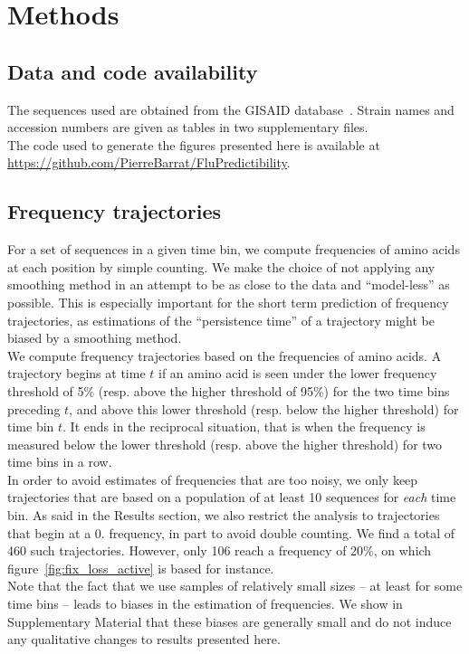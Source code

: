 \documentclass[reprint,amsmath,amssymb,superscriptaddress,showpacs,pre]{revtex4-1}
\begin{document}

\section*{Methods} %
\label{sec:methods}

\subsection*{Data and code availability} %
\label{sub:data}
	The sequences used are obtained from the GISAID database~\cite{shu2017gisaid}. 
	Strain names and accession numbers are given as tables in two supplementary files. \\
	The code used to generate the figures presented here is available at \url{https://github.com/PierreBarrat/FluPredictibility}. 

\subsection*{Frequency trajectories} %
\label{sub:frequency_trajectories}
	
	For a set of sequences in a given time bin, we compute frequencies of amino acids at each position by simple counting. We make the choice of not applying any smoothing method in an attempt to be as close to the data and ``model-less'' as possible. This is especially important for the short term prediction of frequency trajectories, as estimations of the ``persistence time'' of a trajectory might be biased by a smoothing method. \\
	We compute frequency trajectories based on the frequencies of amino acids. A trajectory begins at time $t$ if an amino acid is seen under the lower frequency threshold of 5\% (resp. above the higher threshold of 95\%) for the two time bins preceding $t$, and above this lower threshold (resp. below the higher threshold) for time bin $t$. It ends in the reciprocal situation, that is when the frequency is measured below the lower threshold (resp. above the higher threshold) for two time bins in a row. \\
	In order to avoid estimates of frequencies that are too noisy, we only keep trajectories that are based on a population of at least 10 sequences for \emph{each} time bin. As said in the Results section, we also restrict the analysis to trajectories that begin at a $0.$ frequency, in part to avoid double counting. We find a total of 460 such trajectories. However, only 106 reach a frequency of 20\%, on which figure~\ref{fig:fix_loss_active} is based for instance.  \\
	Note that the fact that we use samples of relatively small sizes -- at least for some time bins -- leads to biases in the estimation of frequencies. We show in Supplementary Material that these biases are generally small and do not induce any qualitative changes to results presented here. 
\end{document}
